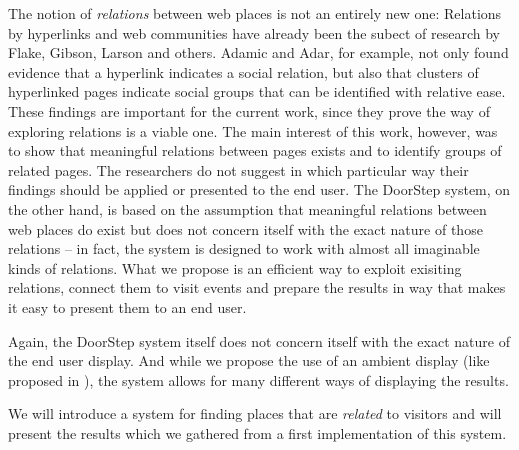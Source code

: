 \documentclass[a4paper]{danarticle}
\theoremstyle{remark}
\begin{document}
    The notion of \emph{relations} between web places is not an entirely new 
    one: Relations by hyperlinks and web communities have already 
    been the subect of research by Flake\cite{flake}, Gibson\cite{gibson}, 
    Larson\cite{larson} and others. 
    Adamic and Adar\cite{links}, for example, not only found 
    evidence that a hyperlink indicates a social relation, but also that 
    clusters of hyperlinked pages indicate social groups that can be identified 
    with relative ease. These findings are important for the current work, 
    since they prove the way of exploring relations is a viable one. The main
    interest of this work, however, was to show that meaningful relations 
    between pages exists and to identify groups of related pages. The
    researchers do not suggest in which particular way their findings should be 
    applied or presented to the end user. 
    The DoorStep system, on the other hand, is based on the assumption that 
    meaningful relations between web places do exist but does not concern itself 
    with the exact nature of those relations -- in fact, the system is designed 
    to work with almost all imaginable kinds of relations. What we propose is an 
    efficient way to exploit exisiting relations, connect them to visit events 
    and prepare the results in way that makes it easy to present them to an end 
    user.
    
    Again, the DoorStep system itself does not concern itself with the exact 
    nature of the end user display. And while we propose the use of an ambient 
    display (like proposed in \cite{ambient}), the system allows for many 
    different ways of displaying the results.
    
    We will introduce a system for finding places that are \textit{related} to
    visitors and will present the results which we gathered from a first
    implementation of this system.
\end{document}
